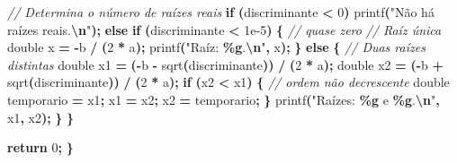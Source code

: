 \documentclass[
  11pt,
  a4paper,
]{scrbook}
\newenvironment{Shaded}{\begin{snugshade}}{\end{snugshade}}
\newcommand{\CommentTok}[1]{\textcolor[rgb]{0.56,0.35,0.01}{\textit{#1}}}
\newcommand{\ControlFlowTok}[1]{\textcolor[rgb]{0.13,0.29,0.53}{\textbf{#1}}}
\newcommand{\DataTypeTok}[1]{\textcolor[rgb]{0.13,0.29,0.53}{#1}}
\newcommand{\DecValTok}[1]{\textcolor[rgb]{0.00,0.00,0.81}{#1}}
\newcommand{\FloatTok}[1]{\textcolor[rgb]{0.00,0.00,0.81}{#1}}
\newcommand{\NormalTok}[1]{#1}
\newcommand{\OperatorTok}[1]{\textcolor[rgb]{0.81,0.36,0.00}{\textbf{#1}}}
\newcommand{\SpecialCharTok}[1]{\textcolor[rgb]{0.81,0.36,0.00}{\textbf{#1}}}
\newcommand{\StringTok}[1]{\textcolor[rgb]{0.31,0.60,0.02}{#1}}
\begin{document}
\begin{Shaded}
\begin{Highlighting}[]
        \CommentTok{// Determina o número de raízes reais}
        \ControlFlowTok{if} \OperatorTok{(}\NormalTok{discriminante }\OperatorTok{\textless{}} \DecValTok{0}\OperatorTok{)}
\NormalTok{            printf}\OperatorTok{(}\StringTok{"Não há raízes reais.}\SpecialCharTok{\textbackslash{}n}\StringTok{"}\OperatorTok{);}
        \ControlFlowTok{else} \ControlFlowTok{if} \OperatorTok{(}\NormalTok{discriminante }\OperatorTok{\textless{}} \FloatTok{1e{-}5}\OperatorTok{)} \OperatorTok{\{}  \CommentTok{// quase zero}
            \CommentTok{// Raíz única}
            \DataTypeTok{double}\NormalTok{ x }\OperatorTok{=} \OperatorTok{{-}}\NormalTok{b }\OperatorTok{/} \OperatorTok{(}\DecValTok{2} \OperatorTok{*}\NormalTok{ a}\OperatorTok{);}
\NormalTok{            printf}\OperatorTok{(}\StringTok{"Raíz: }\SpecialCharTok{\%g}\StringTok{.}\SpecialCharTok{\textbackslash{}n}\StringTok{"}\OperatorTok{,}\NormalTok{ x}\OperatorTok{);}
        \OperatorTok{\}}
        \ControlFlowTok{else} \OperatorTok{\{}
            \CommentTok{// Duas raízes distintas}
            \DataTypeTok{double}\NormalTok{ x1 }\OperatorTok{=} \OperatorTok{({-}}\NormalTok{b }\OperatorTok{{-}}\NormalTok{ sqrt}\OperatorTok{(}\NormalTok{discriminante}\OperatorTok{))} \OperatorTok{/} \OperatorTok{(}\DecValTok{2} \OperatorTok{*}\NormalTok{ a}\OperatorTok{);}
            \DataTypeTok{double}\NormalTok{ x2 }\OperatorTok{=} \OperatorTok{({-}}\NormalTok{b }\OperatorTok{+}\NormalTok{ sqrt}\OperatorTok{(}\NormalTok{discriminante}\OperatorTok{))} \OperatorTok{/} \OperatorTok{(}\DecValTok{2} \OperatorTok{*}\NormalTok{ a}\OperatorTok{);}
            \ControlFlowTok{if} \OperatorTok{(}\NormalTok{x2 }\OperatorTok{\textless{}}\NormalTok{ x1}\OperatorTok{)} \OperatorTok{\{} \CommentTok{// ordem não decrescente}
                \DataTypeTok{double}\NormalTok{ temporario }\OperatorTok{=}\NormalTok{ x1}\OperatorTok{;}
\NormalTok{                x1 }\OperatorTok{=}\NormalTok{ x2}\OperatorTok{;}
\NormalTok{                x2 }\OperatorTok{=}\NormalTok{ temporario}\OperatorTok{;}
            \OperatorTok{\}}
\NormalTok{            printf}\OperatorTok{(}\StringTok{"Raízes: }\SpecialCharTok{\%g}\StringTok{ e }\SpecialCharTok{\%g}\StringTok{.}\SpecialCharTok{\textbackslash{}n}\StringTok{"}\OperatorTok{,}\NormalTok{ x1}\OperatorTok{,}\NormalTok{ x2}\OperatorTok{);}
        \OperatorTok{\}}
    \OperatorTok{\}}

    \ControlFlowTok{return} \DecValTok{0}\OperatorTok{;}
\OperatorTok{\}}
\end{Highlighting}
\end{Shaded}
\end{document}
